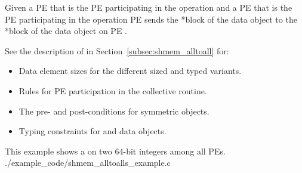 \begin{apidefinition}
{    Given a \ac{PE}  that is the \kth \ac{PE}
    participating in the operation and a \ac{PE}
     that is the \lth \ac{PE}
    participating in the operation
    \ac{PE}  sends the *\lth block of the  data object to
    the *\kth block of the  data object on
    \ac{PE} .

    See the description of  in
    Section~\ref{subsec:shmem_alltoall} for:
    \begin{itemize}
    \item Data element sizes for the different sized and typed  variants.
    \item Rules for \ac{PE} participation in the collective routine.
    \item The pre- and post-conditions for symmetric objects.
    \item Typing constraints for \dest{} and \source{} data objects.
    \end{itemize}
    
} 



\begin{apiexamples}

\apicexample
    {This \CorCpp{} example shows a  on two 64-bit integers among
    all \acp{PE}.}
    {./example_code/shmem_alltoalls_example.c}
    {}

\end{apiexamples}

\end{apidefinition}
